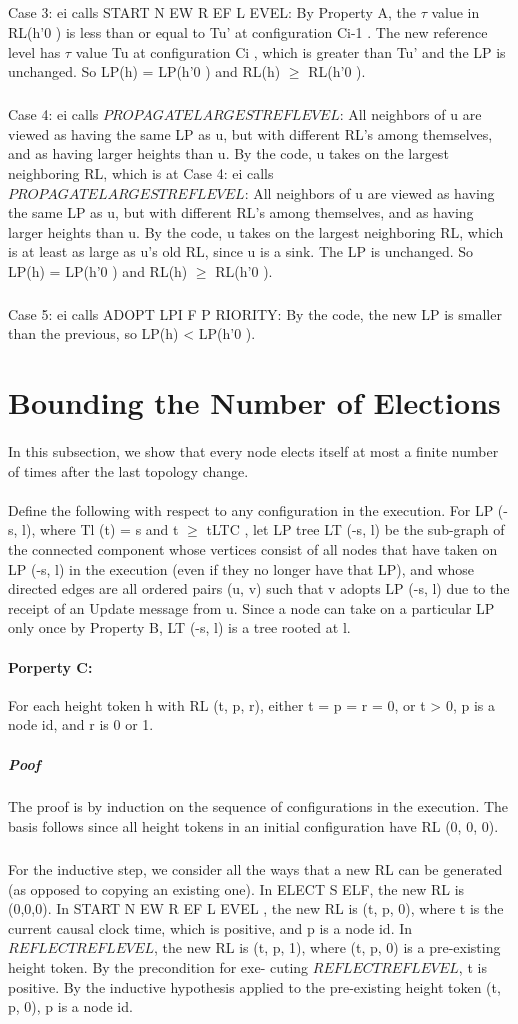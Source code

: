 \subparagraph{}Case 3: ei calls START N EW R EF L EVEL: By Property A, the $\tau$ value in RL(h'0 ) is less than or equal to Tu' at configuration Ci-1 . The new reference level has $\tau$ value Tu at configuration Ci , which is greater than Tu' and the LP is unchanged. So LP(h) = LP(h'0 ) and RL(h) $\geq$ RL(h'0 ).
\subparagraph{}Case 4: ei calls $PROPAGATELARGESTREFLEVEL$: All neighbors of u are viewed as having the same LP as u, but with different RL's among themselves, and as having larger heights than u. By the code, u takes on the largest neighboring RL, which is at Case 4: ei calls $PROPAGATELARGESTREFLEVEL$: All neighbors of u are viewed as having the same LP as u, but with different RL's among themselves, and as having larger heights than u. By the code, u takes on the largest neighboring RL, which is at least as large as u's old RL, since u is a sink. The LP is unchanged. So LP(h) = LP(h'0 ) and RL(h) $\geq$ RL(h'0 ).
\subparagraph{}Case 5: ei calls ADOPT LPI F P RIORITY: By the code, the new LP is smaller than the previous, so LP(h) < LP(h'0 ).
\section{Bounding the Number of Elections}
\paragraph{}In this subsection, we show that every node elects itself at most a finite number of times after the last topology change.
\paragraph{}Define the following with respect to any configuration in the execution. For LP (-s, l), where Tl (t) = s and t $\geq$ tLTC , let LP tree LT (-s, l) be the sub-graph of the connected component whose vertices consist of all nodes that have taken on LP (-s, l) in the execution (even if they no longer have that LP), and whose directed edges are all ordered pairs (u, v) such that v adopts LP (-s, l) due to the receipt of an Update message from u. Since a node can take on a particular LP only once by Property B, LT (-s, l) is a tree rooted at l.
\paragraph{Porperty C:}For each height token h with RL (t, p, r), either t = p = r = 0, or t > 0, p is a node id, and r is 0 or 1.
\subparagraph{Poof}The proof is by induction on the sequence of configurations in the execution. The basis follows since all height tokens in an initial configuration have RL (0, 0, 0).
\subparagraph{}For the inductive step, we consider all the ways that a new RL can be generated (as opposed to copying an existing one). In ELECT S ELF, the new RL is (0,0,0). In START N EW R EF L EVEL , the new RL is (t, p, 0), where t is the current causal clock time, which is positive, and p is a node id. In $REFLECTREFLEVEL$, the new RL is (t, p, 1), where (t, p, 0) is a pre-existing height token. By the precondition for exe- cuting $REFLECTREFLEVEL$, t is positive. By the inductive hypothesis applied to the pre-existing height token (t, p, 0), p is a node id.
